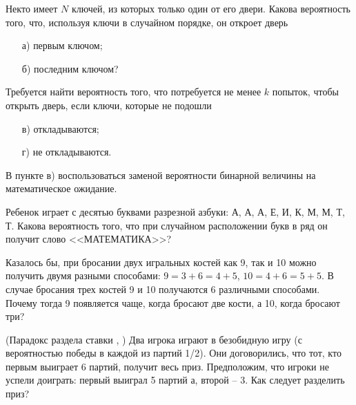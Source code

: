 

\begin{problem}
Некто имеет $N$ ключей, из которых только один от его двери. Какова вероятность того, что, используя ключи в случайном порядке, 
он откроет дверь 
\begin{enumerate}
\item[а)] первым ключом; 
\item[б)] последним ключом? 
\end{enumerate}
Требуется найти вероятность того, что потребуется не менее $k$ попыток, чтобы открыть дверь, если ключи, которые не подошли 
\begin{enumerate}
\item[в)] откладываются; 
\item[г)] не откладываются. 
\end{enumerate}

\begin{ordre}
В пункте в) воспользоваться заменой вероятности бинарной величины на математическое ожидание.
\end{ordre}

\end{problem}


\begin{problem}
Ребенок играет с десятью буквами разрезной азбуки: А, А, А, Е, И, К, М, М, Т, Т. 
Какова вероятность того, что при случайном расположении букв в ряд он получит слово <<МАТЕМАТИКА>>? 
\end{problem}


\begin{problem}
Казалось бы, при бросании двух игральных костей как 9, так и 10 можно получить двумя разными способами: $9 = 3+6 = 4+5$, $10 = 4+6 = 5+5$. В случае бросания трех костей 9 и 10 получаются 6 различными способами. Почему тогда 9 появляется чаще, когда бросают две кости, а 10, когда бросают три? 
\end{problem}



\begin{problem}(Парадокс раздела ставки \cite{2013}, \cite{book12})
Два игрока играют в безобидную игру (с вероятностью победы в каждой из партий 1/2). Они договорились, что тот, кто первым выиграет 6 партий, получит  весь приз. Предположим, что игроки не успели доиграть: первый выиграл 5 партий а, второй -- 3. Как следует разделить приз?   
\end{problem}

